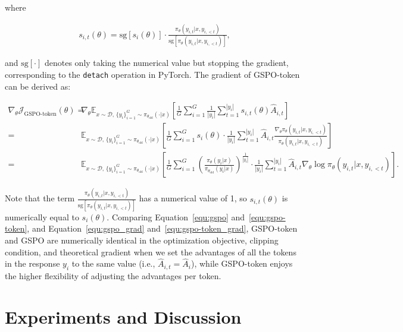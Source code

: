 where

\begin{align}
s_{i,t}(\theta) 
= \mathrm{sg} \left[ s_{i}(\theta) \right]  \cdot \frac{ \pi_{\theta} (y_{i,t} | x, y_{i,<t}) }{ \mathrm{sg} \left[ \pi_{\theta} (y_{i,t} | x, y_{i,<t}) \right] },
\end{align}

and $\mathrm{sg}[\cdot]$ denotes only taking the numerical value but stopping the gradient, corresponding to the \texttt{detach} operation in PyTorch. The gradient of GSPO-token can be derived as:

\begin{align}
\nabla_{\theta} \mathcal{J}_\text{GSPO-token}(\theta)
=&\ 
\nabla_{\theta} \mathbb{E}_{ x \sim \mathcal{D},\, \{y_i\}_{i=1}^G \sim \pi_{\theta_\text{old}}( \cdot | x) }
\left[ 
\frac{1}{G} \sum_{i=1}^{G}
\frac{1}{|y_i|} \sum_{t=1}^{|y_i|} 
s_{i,t}(\theta) \widehat{A}_{i,t}
\right] \\
=&\ 
\mathbb{E}_{ x \sim \mathcal{D},\, \{y_i\}_{i=1}^G \sim \pi_{\theta_\text{old}}( \cdot | x) }
\left[ 
\frac{1}{G} \sum_{i=1}^{G} s_i (\theta) \cdot \frac{1}{|y_i|} \sum_{t=1}^{|y_i|} 
\widehat{A}_{i,t} \frac{ \nabla_{\theta} \pi_{\theta} (y_{i,t} | x, y_{i,<t}) }{ \pi_{\theta} (y_{i,t} | x, y_{i,<t}) }
\right] \\
=&\ 
\mathbb{E}_{ x \sim \mathcal{D},\, \{y_i\}_{i=1}^G \sim \pi_{\theta_\text{old}}( \cdot | x) }
\left[ 
\frac{1}{G} \sum_{i=1}^{G}  \left( \frac{ \pi_{\theta} (y_i | x) }{ \pi_{\theta_\text{old}} (y_i | x)} \right)^{\frac{1}{|y_i|}}
\cdot \frac{1}{|y_i|} \sum_{t=1}^{|y_i|}
\widehat{A}_{i,t} \nabla_{\theta} \log \pi_{\theta} (y_{i,t} | x, y_{i,<t})  
\right].
\label{equ:gspo-token_grad}
\end{align}

Note that the term $\frac{ \pi_{\theta} (y_{i,t} | x, y_{i,<t}) }{ \mathrm{sg} \left[ \pi_{\theta} (y_{i,t} | x, y_{i,<t}) \right] }$ has a numerical value of 1, so $s_{i,t}(\theta)$ is numerically equal to $s_{i}(\theta)$.
Comparing Equation~\eqref{equ:gspo} and~\eqref{equ:gspo-token}, and Equation~\eqref{equ:gspo_grad} and~\eqref{equ:gspo-token_grad}, GSPO-token and GSPO are numerically identical in the optimization objective, clipping condition, and theoretical gradient when we set the advantages of all the tokens in the response $y_i$ to the same value (i.e., $\widehat{A}_{i,t} = \widehat{A}_{i}$), while GSPO-token enjoys the higher flexibility of adjusting the advantages per token.

\section{Experiments and Discussion}

